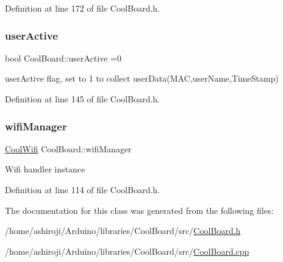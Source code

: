 Definition at line 172 of file Cool\+Board.\+h.

\mbox{\label{class_cool_board_a6395459131d6889a3005f79c7a35e964}} 
\subsubsection{\texorpdfstring{user\+Active}{userActive}}
{\footnotesize\ttfamily bool Cool\+Board\+::user\+Active =0\hspace{0.3cm}{\ttfamily [private]}}

user\+Active flag, set to 1 to collect user\+Data(\+M\+A\+C,user\+Name,\+Time\+Stamp) 

Definition at line 145 of file Cool\+Board.\+h.

\mbox{\label{class_cool_board_acd88e6003606b47479ebba81e4aceeca}} 
\subsubsection{\texorpdfstring{wifi\+Manager}{wifiManager}}
{\footnotesize\ttfamily \hyperlink{class_cool_wifi}{Cool\+Wifi} Cool\+Board\+::wifi\+Manager\hspace{0.3cm}{\ttfamily [private]}}

Wifi handler instance 

Definition at line 114 of file Cool\+Board.\+h.



The documentation for this class was generated from the following files\+:\begin{DoxyCompactItemize}
\item 
/home/ashiroji/\+Arduino/libraries/\+Cool\+Board/src/\hyperlink{_cool_board_8h}{Cool\+Board.\+h}\item 
/home/ashiroji/\+Arduino/libraries/\+Cool\+Board/src/\hyperlink{_cool_board_8cpp}{Cool\+Board.\+cpp}\end{DoxyCompactItemize}
